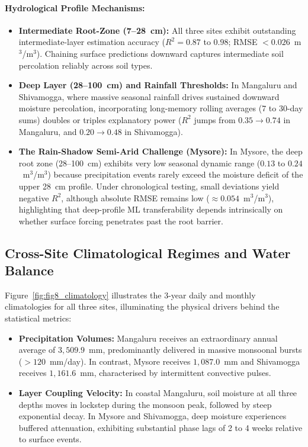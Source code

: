 \documentclass[12pt, a4paper]{article}
\begin{document}
\paragraph{Hydrological Profile Mechanisms:}
\begin{itemize}
    \item \textbf{Intermediate Root-Zone (7--28~cm):} All three sites exhibit outstanding intermediate-layer estimation accuracy ($R^2 = 0.87$ to $0.98$; RMSE $< 0.026$~m$^3$/m$^3$). Chaining surface predictions downward captures intermediate soil percolation reliably across soil types.
    \item \textbf{Deep Layer (28--100~cm) and Rainfall Thresholds:} In Mangaluru and Shivamogga, where massive seasonal rainfall drives sustained downward moisture percolation, incorporating long-memory rolling averages ($7$ to $30$-day sums) doubles or triples explanatory power ($R^2$ jumps from $0.35 \rightarrow 0.74$ in Mangaluru, and $0.20 \rightarrow 0.48$ in Shivamogga).
    \item \textbf{The Rain-Shadow Semi-Arid Challenge (Mysore):} In Mysore, the deep root zone (28--100~cm) exhibits very low seasonal dynamic range ($0.13$ to $0.24$~m$^3$/m$^3$) because precipitation events rarely exceed the moisture deficit of the upper 28~cm profile. Under chronological testing, small deviations yield negative $R^2$, although absolute RMSE remains low ($\approx 0.054$~m$^3$/m$^3$), highlighting that deep-profile ML transferability depends intrinsically on whether surface forcing penetrates past the root barrier.
\end{itemize}

\subsection{Cross-Site Climatological Regimes and Water Balance}

Figure~\ref{fig:fig8_climatology} illustrates the 3-year daily and monthly climatologies for all three sites, illuminating the physical drivers behind the statistical metrics:

\begin{itemize}
    \item \textbf{Precipitation Volumes:} Mangaluru receives an extraordinary annual average of $3,509.9$~mm, predominantly delivered in massive monsoonal bursts ($>120$~mm/day). In contrast, Mysore receives $1,087.0$~mm and Shivamogga receives $1,161.6$~mm, characterised by intermittent convective pulses.
    \item \textbf{Layer Coupling Velocity:} In coastal Mangaluru, soil moisture at all three depths moves in lockstep during the monsoon peak, followed by steep exponential decay. In Mysore and Shivamogga, deep moisture experiences buffered attenuation, exhibiting substantial phase lags of 2 to 4 weeks relative to surface events.
\end{itemize}
\end{document}
